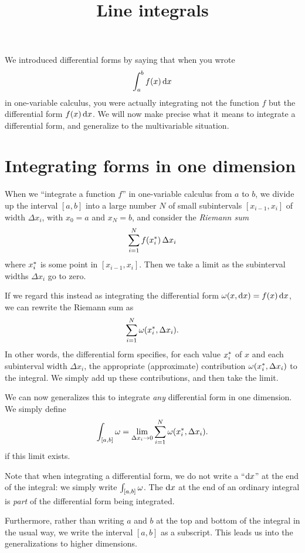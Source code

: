 \documentclass[12pt]{amsart}
\title{Line integrals}
\begin{document}
\maketitle

We introduced differential forms by saying that when you wrote
\[ \itint x a b {f(x)} \]
in one-variable calculus, you were actually integrating not the function $f$ but the differential form $f(x)\,\dx$.
We will now make precise what it means to integrate a differential form, and generalize to the multivariable situation.

\section{Integrating forms in one dimension}
\label{sec:integrating-forms}

When we ``integrate a function $f$'' in one-variable calculus from $a$ to $b$, we divide up the interval $[a,b]$ into a large number $N$ of small subintervals $[x_{i-1},x_i]$ of width $\Delta x_i$, with $x_0 = a$ and $x_N=b$, and consider the \emph{Riemann sum}
\[ \sum_{i=1}^N f(\rstag x i)\, \Delta x_i \]
where $\rstag x i$ is some point in $[x_{i-1},x_i]$.
Then we take a limit as the subinterval widths $\Delta x_i$ go to zero.

If we regard this instead as integrating the differential form $\omega(x,\dx) = f(x)\, \dx$, we can rewrite the Riemann sum as
\[ \sum_{i=1}^N \omega(\rstag x i,\Delta x_i). \]
In other words, the differential form specifies, for each value $\rstag x i$ of $x$ and each subinterval width $\Delta x_i$, the appropriate (approximate) contribution $\omega(\rstag x i,\Delta x_i)$ to the integral.
We simply add up these contributions, and then take the limit.

We can now generalizes this to integrate \emph{any} differential form in one dimension.
We simply define
\[ \lint{[a,b]} \omega = \lim_{\Delta x_i \to 0} \sum_{i=1}^N \omega(\rstag x i,\Delta x_i). \]
if this limit exists.

Note that when integrating a differential form, we do not write a ``$\dx$'' at the end of the integral: we simply write $\lint{[a,b]} \omega$.
The $\dx$ at the end of an ordinary integral is \emph{part} of the differential form being integrated.

Furthermore, rather than writing $a$ and $b$ at the top and bottom of the integral in the usual way, we write the interval $[a,b]$ as a subscript.
This leads us into the generalizations to higher dimensions.
\end{document}
